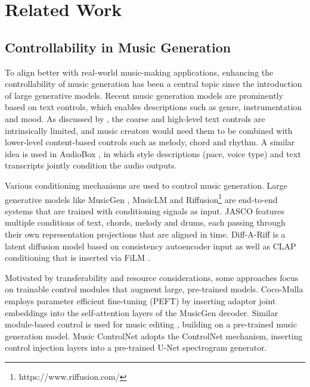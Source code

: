 \section{Related Work}
\subsection{Controllability in Music Generation}

To align better with real-world music-making applications, enhancing the controllability of music generation has been a central topic since the introduction of large generative models. Recent music generation models \cite{Copet2023SimpleGeneration,Agostinelli2023MusicLMText,Melechovsky2024MustangoGeneration} are prominently based on text controls, which enables descriptions such as genre, instrumentation and mood. As discussed by \citet{Lin2024ContentModelling}, the coarse and high-level text controls are intrinsically limited, and music creators would need them to be combined with lower-level content-based controls such as melody, chord and rhythm. 
A similar idea is used in AudioBox \cite{Vyas2023AudioboxPrompts}, in which style descriptions (pace, voice type) and text transcripts jointly condition the audio outputs. 

Various conditioning mechanisms are used to control music generation. Large generative models like MusicGen \cite{Copet2023SimpleGeneration}, MusicLM \cite{Agostinelli2023MusicLMText} and Riffusion\footnote{https://www.riffusion.com/} are end-to-end systems that are trained with conditioning signals as input. JASCO \cite{Tal2024JointGeneration} features multiple conditions of text, chords, melody and drums, each passing through their own representation projections that are aligned in time. Diff-A-Riff \cite{Nistal2024DiffModels} is a latent diffusion model based on consistency autoencoder input as well as CLAP \cite{Wu2023LargeAugmentation} conditioning that is inserted via FiLM \cite{Perez2018FiLMlayer}.

Motivated by transferability and resource considerations, some approaches focus on trainable control modules that augment large, pre-trained models. Coco-Mulla \cite{Lin2024ContentModelling} employs parameter efficient fine-tuning (PEFT) by inserting adaptor joint embeddings into the self-attention layers of the MusicGen decoder. Similar module-based control is used for music editing \cite{Zhang2024Instruct-Musicgen}, building on a pre-trained music generation model. Music ControlNet \cite{Wu2023MusicGeneration} adopts the ControlNet \cite{Zhang2023AddingModels} mechanism, inserting control injection layers into a pre-trained U-Net spectrogram generator. 

